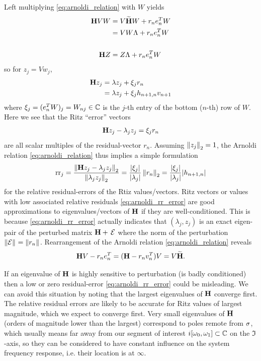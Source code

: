  Left multiplying \eqref{eq:arnoldi_relation} with $W$  yields
\begin{align*}
\H V W &= V\Himp W + r_n e_n^{T} W \\
	&= V W \Lambda + r_n e_n^{T} W\\
\\
\H Z	&= Z \Lambda + r_n e_n^{T} W
\end{align*}
  so for $z_j = Vw_j$,
\[
\begin{aligned}
\H z_j &=  \lambda z_j +  \xi_j r_n \\ 
	  &=  \lambda z_j +  \xi_j h_{n+1,n} v_{n+1} 
\end{aligned}
\]
where $\xi_j = (e_n^T W)_j=W_{nj}\in\C$ is the $j$-th entry of the bottom ($n$-th) row of $W$.  Here we see that the Ritz ``error'' vectors
\[
\H z_j - \lambda_j z_j = \xi_j r_n
\]
are all scalar multiples of the residual-vector $r_n$.  Assuming $\nrm{2}{z_j}=1$, the Arnoldi relation \eqref{eq:arnoldi_relation} thus implies a simple formulation
\begin{equation}
\text{rr}_j = \frac{\nrm{2}{\H z_j - \lambda_j z_j}}{\nrm{2}{\lambda_j z_j}} 
= \frac{|\xi_j|}{|\lambda_j|} \nrm{2}{ r_n} 
= \frac{|\xi_j|}{|\lambda_j|}  |h_{n+1,n}|
\label{eq:arnoldi_rr_error} 
\end{equation}
 for the relative residual-errors of the Rtiz values/vectors.   Ritz vectors or values with low associated relative residuals \eqref{eq:arnoldi_rr_error} are good approximations to eigenvalues/vectors of $\H$ if they are well-conditioned.  This is because \eqref{eq:arnoldi_rr_error} actually indicates that $(\lambda_j,z_j)$ is an exact eigen-pair of the perturbed matrix $\H +\, \mathcal{E}$ where the norm of the perturbation $\nrm{}{\mathcal{E}} = \nrm{}{r_n}$. Rearrangement of the Arnoldi relation \eqref{eq:arnoldi_relation} reveals  
\[
\H V  - r_n e_n^{T} = (\H   - r_n v_n^{T}) V = V\Himp. 
\]

  If an eigenvalue of $\H$ is highly sensitive to perturbation (is badly conditioned) then a low or zero residual-error    \eqref{eq:arnoldi_rr_error} could be misleading.  We can avoid this situation by noting that the largest eigenvalues of $\H$ converge first.   The relative residual errors are likely to be accurate for Ritz values of largest magnitude, which we expect to converge first.  Very small eigenvalues of $\H$ (orders of magnitude lower than the largest) correspond to poles  remote from $\xp$, which usually means far away from our segment of interest $i[\omega_0, \omega_1]\subset \C$ on the $\Im$-axis, so they can be considered to have constant influence on the system frequency response, i.e. their location is at $\infty$.  

